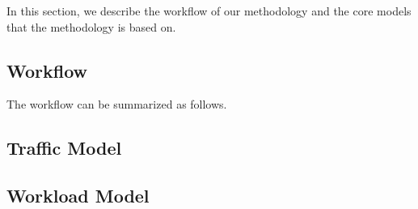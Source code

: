 
In this section, we describe the workflow of our methodology and the core models
that the methodology is based on.

\subsection{Workflow}
The workflow can be summarized as follows.

\subsection{Traffic Model}


\subsection{Workload Model}

